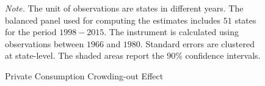 \documentclass[dv_diss_main.tex]{subfiles}
\begin{document}
\begin{figure}[ht]
\begin{center}
\begin{tabular}[c]{ccc}
    
    \end{tabular}
    \caption{Private Consumption Crowding-out Effect}
    \end{center}
    
    
    
    
    \footnotesize{\textit{Note. } The unit of observations are states in different years. The balanced panel used for computing the estimates includes $51$ states for the period $1998-2015$. The instrument is calculated using observations between $1966$ and $1980$. Standard errors are clustered at state-level. The shaded areas report the $90\%$ confidence intervals.}

    \label{fig:crowd_privcons}
\end{figure}
\newpage


\newpage
\end{document}
